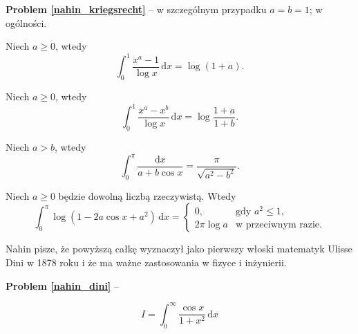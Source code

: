 \textbf{Problem \ref{nahin_kriegsrecht}} -- \cite[s. 67]{nahin15} w szczególnym przypadku $a = b = 1$; \cite[s. 114, 375]{nahin15} w ogólności.

\begin{problem}
    Niech $a \ge 0$, wtedy
    \begin{equation}
        \int_0^1 \frac{x^a - 1}{\log x} \,\mathrm{d}x = \log(1+a).
    \end{equation}
\end{problem}

\begin{problem}
    Niech $a \ge 0$, wtedy
    \begin{equation}
        \int_0^1 \frac{x^a - x^b}{\log x} \,\mathrm{d}x = \log \frac{1+a}{1+b}.
    \end{equation}
\end{problem}

\begin{problem}
    Niech $a > b$, wtedy
    \begin{equation}
        \int_0^\pi \frac{\mathrm{d}x} {a + b \cos x} = \frac{\pi}{\sqrt{a^2 - b^2}}.
    \end{equation}
\end{problem}

\begin{problem}
    \label{nahin_dini}%
    Niech $a \ge 0$ będzie dowolną liczbą rzeczywistą.
    Wtedy
    \begin{equation}
        \int_0^\pi \log (1 - 2 a \cos x + a^2) \,\mathrm{d} x = \begin{cases}
            0, & \text{gdy } a^2 \le 1, \\
            2 \pi \log a & \textrm{w przeciwnym razie}.
        \end{cases}
    \end{equation}
\end{problem}

Nahin pisze, że powyższą całkę wyznaczył jako pierwszy włoski matematyk Ulisse Dini w 1878 roku i że ma ważne zastosowania w fizyce i inżynierii.
%

\textbf{Problem \ref{nahin_dini}} -- \cite[s. 109-112]{nahin15}

\begin{equation}
    I = \int_0^\infty \frac {\cos x}{1+x^2} \,\mathrm{d}x
\end{equation}


%